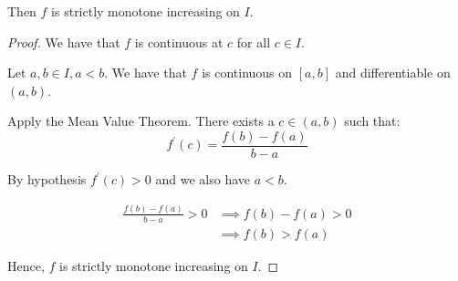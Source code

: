 \documentclass[12pt, letterpaper]{article}
\begin{document}
\begin{enumerate}[label=\bfseries1\alph*)]
Then $f$ is strictly monotone increasing on $I$.

\begin{proof}
    We have that $f$ is continuous at $c$ for all $c \in I$.

    Let $a,b \in I, a<b$. We have that $f$ is continuous on $[a,b]$ and 
    differentiable on $(a,b)$. 

    Apply the Mean Value Theorem. There exists a $c \in (a,b)$ such that:
    \[f^\prime(c) = \frac{f(b) - f(a)}{b-a} \]

    By hypothesis $f^\prime (c) > 0$ and we also have $a < b$.

    \begin{align*}
        \frac{f(b) - f(a)}{b-a} > 0 &\implies f(b)-f(a) > 0 \\
                                       &\implies f(b) > f(a)
    \end{align*}

    Hence, $f$ is strictly monotone increasing on $I$.
\end{proof}
\end{enumerate}
\end{document}
